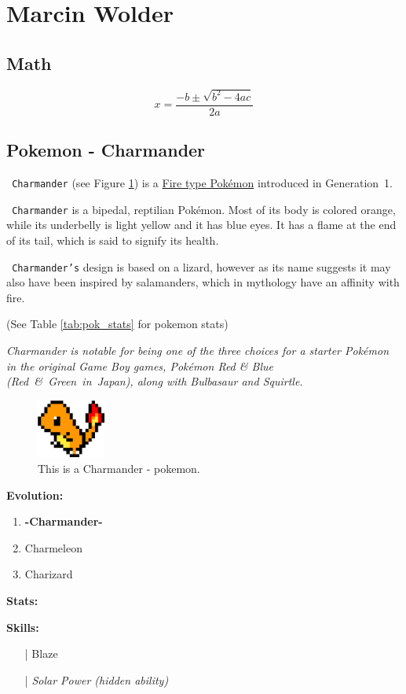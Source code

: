 \section{Marcin Wolder}
\label{sec:marwol}

\subsection{Math}
$${
x = \frac{-b\pm\sqrt{b^2-4ac}}{2a}
}$$

\subsection{Pokemon - Charmander}

\begin{flushleft}
\texttt{ Charmander} (see Figure \ref{fig:pokemon}) is a \underline{Fire type Pokémon} introduced in Generation~1.

\texttt{ Charmander} is a bipedal, reptilian Pokémon. Most of its body is colored orange, while its underbelly is light yellow and it has blue eyes. It has a flame at the end of its tail, which is said to signify its health.

\texttt{ Charmander's} design is based on a lizard, however as its name suggests it may also have been inspired by salamanders, which in mythology have an affinity with fire.

(See Table \ref{tab:pok_stats} for pokemon stats)
\end{flushleft}

\begin{flushright}
\textit{
Charmander is notable for being one of the three choices for a starter Pokémon in the original Game Boy games, Pokémon Red \& Blue (Red~\&~Green~in~Japan), along with Bulbasaur and Squirtle.}  
\end{flushright}

\begin{figure}[htbp]
    \centering
    \includegraphics[width=0.2\textwidth]{pictures/pokemon.png} 
    \caption{This is a Charmander - pokemon.}
    \label{fig:pokemon}
\end{figure}

{\large\textbf{Evolution:}}
\begin{enumerate}
    \item {\textbf{-Charmander-}}
    \item Charmeleon
    \item Charizard
\end{enumerate}

{\large\textbf{Stats:}}


{\large\textbf{Skills:}}
\begin{itemize}
    \item[|] Blaze
    \item[|] {\small \textit{Solar Power (hidden ability)}}
\end{itemize}